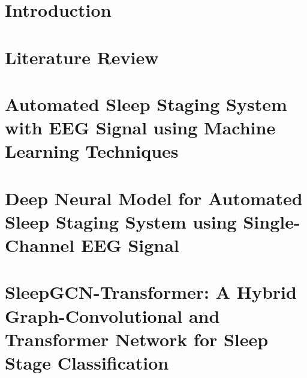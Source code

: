 \documentclass[12pt,a4paper]{report}
\begin{document}
	\pagestyle{plain}\clearpage
        \thispagestyle{empty}
	

         \pagestyle{plain}\clearpage
        \thispagestyle{empty}
	
      



        
	\thispagestyle{empty}
	
	\clearpage\thispagestyle{empty}

\clearpage\thispagestyle{empty}
	
	\thispagestyle{empty}
 
	
	\thispagestyle{empty}
	
        	\tableofcontents
	\listoffigures
	\listoftables
 
    
	\cleardoublepage{}
	\pagestyle{fancy}


\chapter{Introduction}
\label{chapter1}


\chapter{Literature Review}
\label{chapter2}


\chapter{Automated Sleep Staging System with EEG Signal using Machine Learning Techniques}
\label{chapter_paper1}


\chapter{Deep Neural Model for Automated Sleep Staging System using Single-Channel EEG Signal}
\label{chapter_paper2}


\chapter{SleepGCN-Transformer: A Hybrid Graph-Convolutional and Transformer Network for Sleep Stage Classification}
\label{chapter_paper3}

\end{document}
